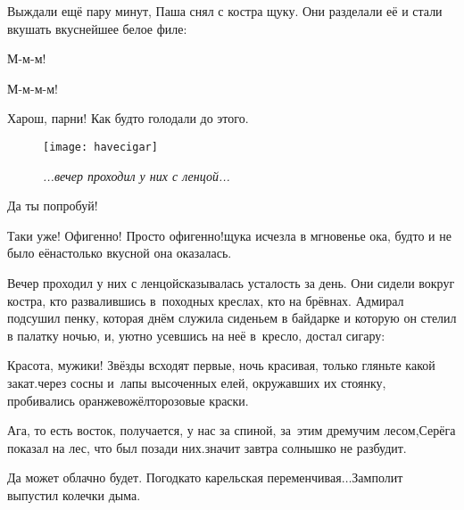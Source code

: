 Выждали ещё пару минут, Паша снял с костра щуку. Они разделали её и стали вкушать вкуснейшее белое филе:

\diagdash М-м-м!

\diagdash М-м-м-м!

\diagdash Харош, парни! Как будто голодали до этого. %


\begin{figure}[h]
	\centering
	\texttt{[image: havecigar]}
	\caption{\small\textit{...вечер проходил у них с ленцой...}}
\end{figure}


\diagdash Да ты попробуй!

\diagdash Таки уже! Офигенно! Просто офигенно!\mdash щука исчезла в мгновенье ока, будто и не было её\mdash настолько вкусной она оказалась.


Вечер проходил у них с ленцой\mdash сказывалась усталость за день. Они сидели вокруг костра, кто развалившись в~походных креслах, кто на брёвнах. Адмирал подсушил пенку, которая днём служила сиденьем в байдарке и которую он стелил в палатку ночью, и, уютно усевшись на неё в~кресло, достал сигару:


\diagdash Красота, мужики! Звёзды всходят первые, ночь красивая, только гляньте какой закат.\mdash через сосны и~лапы высоченных елей, окружавших их стоянку, пробивались оранжево\sdash жёлто\sdash розовые краски.

\diagdash Ага, то есть восток, получается, у нас за спиной, за~этим дремучим лесом,\mdash Серёга показал на лес, что был позади них.\mdash значит завтра солнышко не разбудит. 

\diagdash Да может облачно будет. Погодка\sdash то карельская переменчивая$\ldots$\mdash Замполит выпустил колечки дыма.

